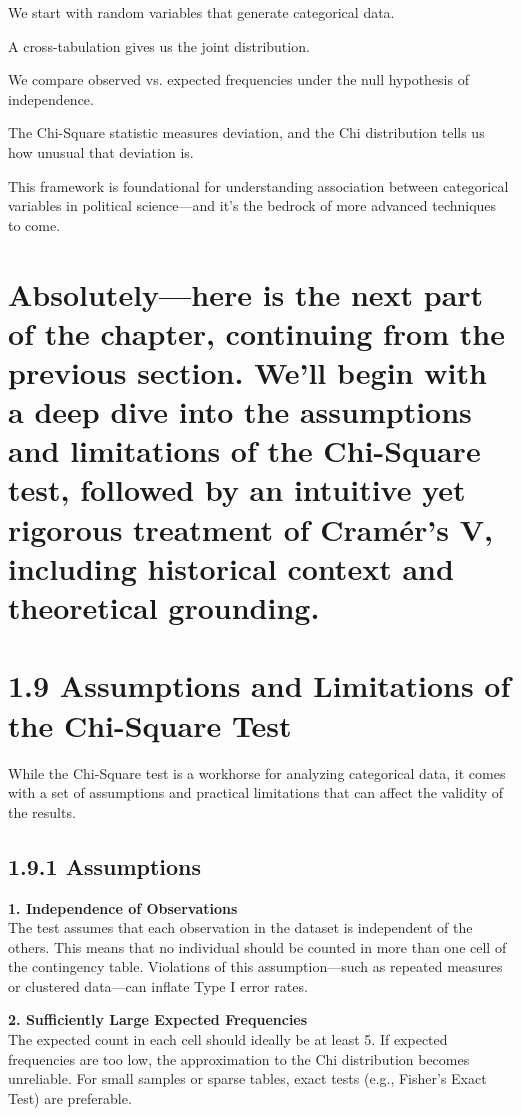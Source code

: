 \documentclass[12pt]{article}
\begin{document}
We start with random variables that generate categorical data.

A cross-tabulation gives us the joint distribution.

We compare observed vs. expected frequencies under the null hypothesis of independence.

The Chi-Square statistic measures deviation, and the Chi distribution tells us how unusual that deviation is.

This framework is foundational for understanding association between categorical variables in political science—and it's the bedrock of more advanced techniques to come.

\section*{Absolutely—here is the next part of the chapter, continuing from the previous section. We’ll begin with a deep dive into the assumptions and limitations of the Chi-Square test, followed by an intuitive yet rigorous treatment of Cramér’s V, including historical context and theoretical grounding.}

\section*{1.9 Assumptions and Limitations of the Chi-Square Test}

While the Chi-Square test is a workhorse for analyzing categorical data, it comes with a set of assumptions and practical limitations that can affect the validity of the results.

\subsection*{1.9.1 Assumptions}

\textbf{1. Independence of Observations} \\
The test assumes that each observation in the dataset is independent of the others. This means that no individual should be counted in more than one cell of the contingency table. Violations of this assumption—such as repeated measures or clustered data—can inflate Type I error rates.

\textbf{2. Sufficiently Large Expected Frequencies} \\
The expected count in each cell should ideally be at least 5. If expected frequencies are too low, the approximation to the Chi distribution becomes unreliable. For small samples or sparse tables, exact tests (e.g., Fisher’s Exact Test) are preferable.
\end{document}

